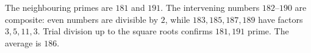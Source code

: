 The neighbouring primes are $181$ and $191$. The intervening numbers $182$--$190$ are composite: even numbers are divisible by $2$, while $183,185,187,189$ have factors $3,5,11,3$. Trial division up to the square roots confirms $181,191$ prime. The average is $\boxed{186}$.
